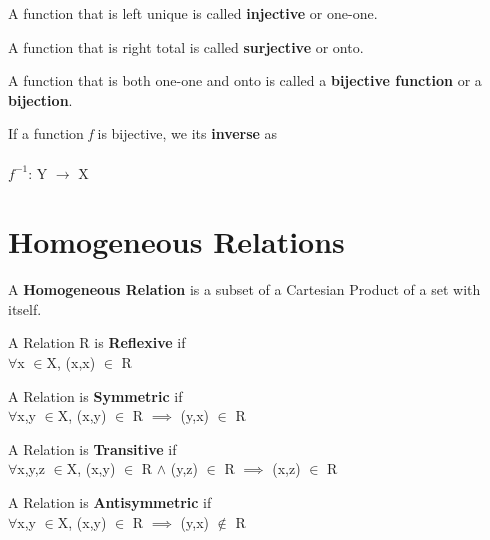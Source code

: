 \documentclass{report}
\begin{document}
\begin{definition}
A function that is left unique is called \textbf{injective} or one-one.
\end{definition}

\begin{definition}
A function that is right total is called \textbf{surjective} or onto.
\end{definition}

\begin{definition}
A function that is both one-one and onto is called a \textbf{bijective function} or a \textbf{bijection}.
\end{definition}
If a function \emph{f} is bijective, we its \textbf{inverse} as\\
\\
$f^{-1}$: Y $\rightarrow$ X\\

\section{Homogeneous Relations}
\begin{definition}
A \textbf{Homogeneous Relation} is a subset of a Cartesian Product of a set with itself.
\end{definition}

\begin{definition}
A Relation R is \textbf{Reflexive} if \\
$\forall$x $\in$X, (x,x) $\in$ R
\end{definition}

\begin{definition}
A Relation is \textbf{Symmetric} if \\
$\forall$x,y $\in$X, (x,y) $\in$ R $\implies$ (y,x) $\in$ R
\end{definition}

\begin{definition}
A Relation is \textbf{Transitive} if \\
$\forall$x,y,z $\in$X, (x,y) $\in$ R $\wedge$ (y,z) $\in$ R $\implies$ (x,z) $\in$ R
\end{definition}

\begin{definition}
A Relation is \textbf{Antisymmetric} if \\
$\forall$x,y $\in$X, (x,y) $\in$ R $\implies$ (y,x) $\notin$ R
\end{definition}
\end{document}
